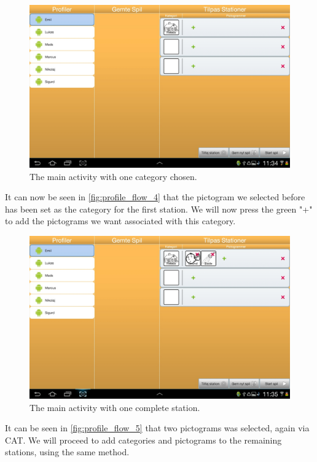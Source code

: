 \begin{figure}[H]
\centering
\includegraphics[width=1.0\linewidth]{img/screenshots/profile_flow_4.jpg}%
\caption{The main activity with one category chosen.}
\label{fig:profile_flow_4}
\end{figure}

It can now be seen in \autoref{fig:profile_flow_4} that the pictogram we selected before has been set as the category for the first station. We will now press the green "+" to add the pictograms we want associated with this category.

\begin{figure}[H]
\centering
\includegraphics[width=1.0\linewidth]{img/screenshots/profile_flow_5.jpg}%
\caption{The main activity with one complete station.}
\label{fig:profile_flow_5}
\end{figure}

It can be seen in \autoref{fig:profile_flow_5} that two pictograms was selected, again via CAT.  We will proceed to add categories and pictograms to the remaining stations, using the same method.

